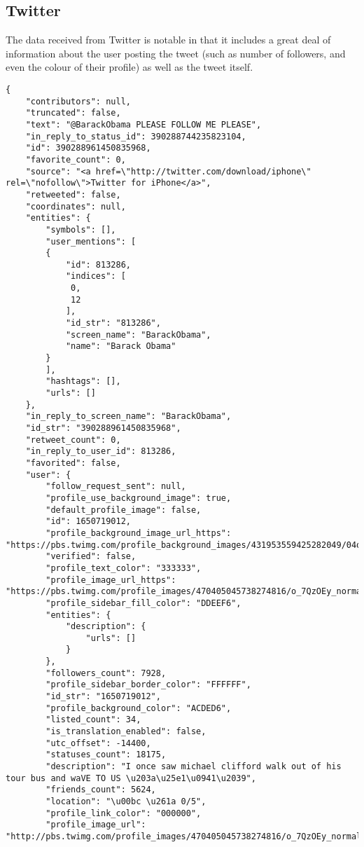 \subsection{Twitter}
\label{raw:api:twitter}
The data received from Twitter is notable in that it includes a great deal of information about the user posting the tweet (such as number of followers, and even the colour of their profile) as well as the tweet itself.
\begin{lstlisting}[breaklines]
{
    "contributors": null, 
    "truncated": false, 
    "text": "@BarackObama PLEASE FOLLOW ME PLEASE", 
    "in_reply_to_status_id": 390288744235823104, 
    "id": 390288961450835968, 
    "favorite_count": 0, 
    "source": "<a href=\"http://twitter.com/download/iphone\" rel=\"nofollow\">Twitter for iPhone</a>", 
    "retweeted": false, 
    "coordinates": null, 
    "entities": {
        "symbols": [], 
        "user_mentions": [
        {
            "id": 813286, 
            "indices": [
             0, 
             12
            ], 
            "id_str": "813286", 
            "screen_name": "BarackObama", 
            "name": "Barack Obama"
        }
        ], 
        "hashtags": [], 
        "urls": []
    }, 
    "in_reply_to_screen_name": "BarackObama", 
    "id_str": "390288961450835968", 
    "retweet_count": 0, 
    "in_reply_to_user_id": 813286, 
    "favorited": false, 
    "user": {
        "follow_request_sent": null, 
        "profile_use_background_image": true, 
        "default_profile_image": false, 
        "id": 1650719012, 
        "profile_background_image_url_https": "https://pbs.twimg.com/profile_background_images/431953559425282049/04og3Ngm.jpeg", 
        "verified": false, 
        "profile_text_color": "333333", 
        "profile_image_url_https": "https://pbs.twimg.com/profile_images/470405045738274816/o_7QzOEy_normal.jpeg", 
        "profile_sidebar_fill_color": "DDEEF6", 
        "entities": {
            "description": {
                "urls": []
            }
        }, 
        "followers_count": 7928, 
        "profile_sidebar_border_color": "FFFFFF", 
        "id_str": "1650719012", 
        "profile_background_color": "ACDED6", 
        "listed_count": 34, 
        "is_translation_enabled": false, 
        "utc_offset": -14400, 
        "statuses_count": 18175, 
        "description": "I once saw michael clifford walk out of his tour bus and waVE TO US \u203a\u25e1\u0941\u2039", 
        "friends_count": 5624, 
        "location": "\u00bc \u261a 0/5", 
        "profile_link_color": "000000", 
        "profile_image_url": "http://pbs.twimg.com/profile_images/470405045738274816/o_7QzOEy_normal.jpeg", 

\end{lstlisting}
